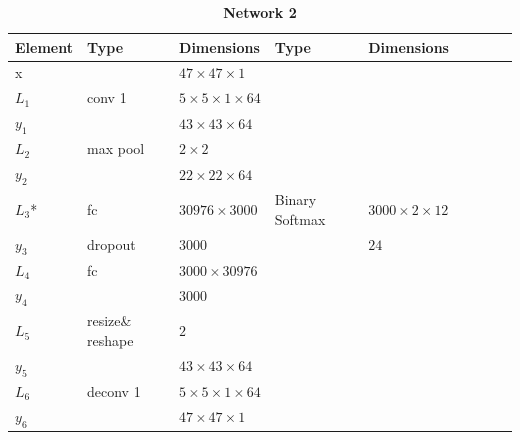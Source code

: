 
    \begin{table}[h!] \caption*{\textbf{Network 2}}
    \centering
    {\footnotesize
    \begin{tabular}{|lllllllll|}
    \hline
    \multicolumn{1}{|l|}{Element} & Type     & \multicolumn{1}{l|}{Dimensions}                     & Type     & \multicolumn{1}{l|}{Dimensions}  \\ \hline
    \multicolumn{1}{|l|}{x}       &          & \multicolumn{1}{l|}{$47\times47\times1$}            &          & \multicolumn{1}{l|}{}            \\ \hline
    \multicolumn{1}{|l|}{$L_1$}   & conv 1   & \multicolumn{1}{l|}{$5\times 5\times1\times 64$}    &          & \multicolumn{1}{l|}{}            \\
    \multicolumn{1}{|l|}{$y_1$}   &          & \multicolumn{1}{l|}{$43\times43\times64$}           &          & \multicolumn{1}{l|}{}            \\ \hline
    \multicolumn{1}{|l|}{$L_2$}   & max pool & \multicolumn{1}{l|}{$2\times 2$}                    &          & \multicolumn{1}{l|}{}            \\
    \multicolumn{1}{|l|}{$y_2$}   &          & \multicolumn{1}{l|}{$22\times22\times 64$}          &          & \multicolumn{1}{l|}{}            \\ \hline
    \multicolumn{1}{|l|}{$L_3$*}   & fc       & \multicolumn{1}{l|}{$30976\times3000$}              & Binary
                                                                                                      Softmax & \multicolumn{1}{l|}{$3000\times2\times12$}        \\
    \multicolumn{1}{|l|}{$y_3$}   & dropout  & \multicolumn{1}{l|}{$3000$}                         &          & \multicolumn{1}{l|}{$24$}        \\ \hline
    \multicolumn{1}{|l|}{$L_4$}   & fc       & \multicolumn{1}{l|}{$3000\times30976$}              &          & \multicolumn{1}{l|}{}            \\
    \multicolumn{1}{|l|}{$y_4$}   &          & \multicolumn{1}{l|}{$3000$}                         &          & \multicolumn{1}{l|}{}            \\ \hline
    \multicolumn{1}{|l|}{$L_5$}   & resize\& reshape & \multicolumn{1}{l|}{$2$}                    &          & \multicolumn{1}{l|}{}            \\
    \multicolumn{1}{|l|}{$y_5$}   &            & \multicolumn{1}{l|}{$43\times43\times 64$}          &          & \multicolumn{1}{l|}{}            \\ \hline
    \multicolumn{1}{|l|}{$L_6$}   & deconv 1   & \multicolumn{1}{l|}{$5\times 5\times1\times 64$}  &          & \multicolumn{1}{l|}{}            \\
    \multicolumn{1}{|l|}{$y_6$}   &            & \multicolumn{1}{l|}{$47\times47\times1$}            &          & \multicolumn{1}{l|}{}             \\ \hline
    \end{tabular}

}
\end{table}
